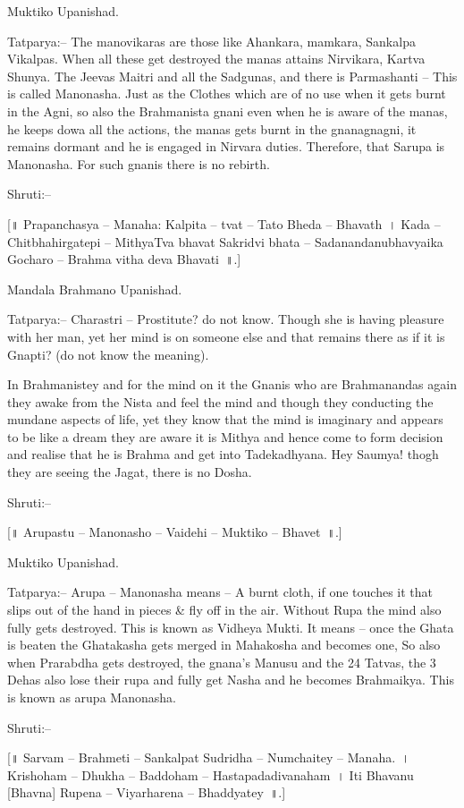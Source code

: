 Muktiko Upanishad.

Tatparya:– The manovikaras are those like Ahankara, mamkara, Sankalpa Vikalpas. When all these get destroyed the manas attains Nirvikara, Kartva Shunya. The Jeevas Maitri and all the Sadgunas, and there is Parmashanti – This is called Manonasha. Just as the Clothes which are of no use when it gets burnt in the Agni, so also the Brahmanista gnani even when he is aware of the manas, he keeps dowa all the actions, the manas gets burnt in the gnanagnagni, it remains dormant and he is engaged in Nirvara duties. Therefore, that Sarupa is Manonasha. For such gnanis there is no rebirth.

Shruti:–

[॥ Prapanchasya – Manaha: Kalpita – tvat – Tato Bheda – Bhavath~। Kada – Chitbhahirgatepi – MithyaTva bhavat Sakridvi bhata – Sadanandanubhavyaika Gocharo – Brahma vitha deva Bhavati~॥.]

Mandala Brahmano Upanishad.

Tatparya:– Charastri – Prostitute? do not know. Though she is having pleasure with her man, yet her mind is on someone else and that remains there as if it is Gnapti? (do not know the meaning).

In Brahmanistey and for the mind on it the Gnanis who are Brahmanandas again they awake from the Nista and feel the mind and though they conducting the mundane aspects of life, yet they know that the mind is imaginary and appears to be like a dream they are aware it is Mithya and hence come to form decision and realise that he is Brahma and get into Tadekadhyana. Hey Saumya! thogh they are seeing the Jagat, there is no Dosha.

Shruti:–

[॥ Arupastu – Manonasho – Vaidehi – Muktiko – Bhavet~॥.]

Muktiko Upanishad.

Tatparya:– Arupa – Manonasha means – A burnt cloth, if one touches it that slips out of the hand in pieces \& fly off in the air. Without Rupa the mind also fully gets destroyed. This is known as Vidheya Mukti. It means – once the Ghata is beaten the Ghatakasha gets merged in Mahakosha and becomes one, So also when Prarabdha gets destroyed, the gnana's Manusu and the 24 Tatvas, the 3 Dehas also lose their rupa and fully get Nasha and he becomes Brahmaikya. This is known as arupa Manonasha.

Shruti:–

[॥ Sarvam – Brahmeti – Sankalpat Sudridha – Numchaitey – Manaha.~। Krishoham – Dhukha – Baddoham – Hastapadadivanaham~। Iti Bhavanu [Bhavna] Rupena – Viyarharena – Bhaddyatey~॥.]

